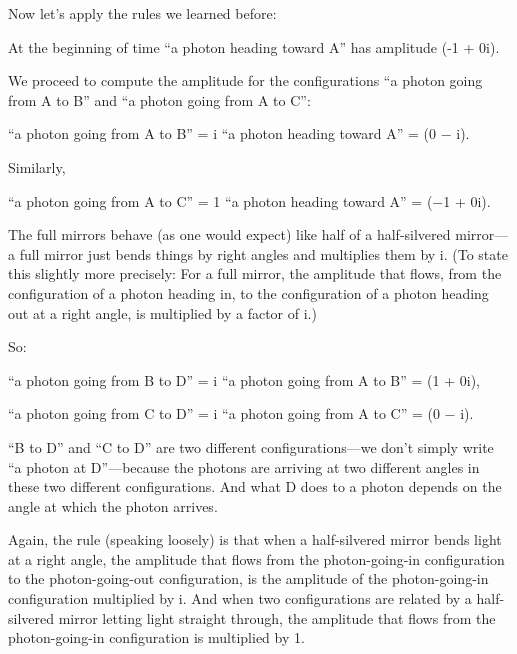 {
 Now let's apply the rules we learned before:}

{
 At the beginning of time ``a photon heading
toward A'' has amplitude (-1 + 0i).}

{
 We proceed to compute the amplitude for the configurations
``a photon going from A to B'' and
``a photon going from A to C'':}

{\centering
 ``a photon going from A to B''
= i {\texttimes} ``a photon heading toward
A'' = (0 $-$ i).
\par}


\bigskip

{
 Similarly,}

{\centering
 ``a photon going from A to C''
= 1 {\texttimes} ``a photon heading toward
A'' = ($-$1 + 0i).
\par}


\bigskip

{
 The full mirrors behave (as one would expect) like half of a
half-silvered mirror---a full mirror just bends things by right angles
and multiplies them by i. (To state this slightly more precisely: For a
full mirror, the amplitude that flows, from the configuration of a
photon heading in, to the configuration of a photon heading out at a
right angle, is multiplied by a factor of i.)}

{
 So:}

{\centering
 ``a photon going from B to D''
= i {\texttimes} ``a photon going from A to
B'' = (1 + 0i),
\par}


\bigskip

{\centering
 ``a photon going from C to D''
= i {\texttimes} ``a photon going from A to
C'' = (0 $-$ i).
\par}


\bigskip

{
 ``B to D'' and
``C to D'' are two different
configurations---we don't simply write
``a photon at D''---because the
photons are arriving at two different angles in these two different
configurations. And what D does to a photon depends on the angle at
which the photon arrives.}

{
 Again, the rule (speaking loosely) is that when a half-silvered
mirror bends light at a right angle, the amplitude that flows from the
photon-going-in configuration to the photon-going-out configuration, is
the amplitude of the photon-going-in configuration multiplied by i. And
when two configurations are related by a half-silvered mirror letting
light straight through, the amplitude that flows from the
photon-going-in configuration is multiplied by 1.}

